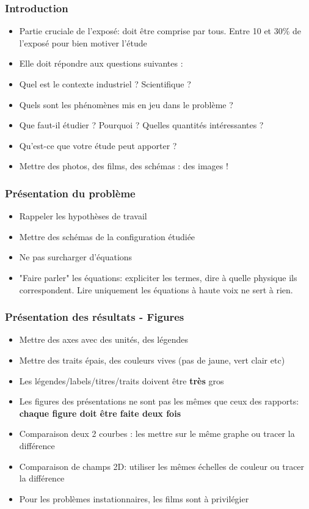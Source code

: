 \begin{appendix}
\subsubsection{Introduction}
\begin{itemize}
\item Partie cruciale de l’exposé: doit être comprise par tous. Entre 10 et 30\% de l’exposé pour bien motiver l’étude
\item Elle doit répondre aux questions suivantes :
\item Quel est le contexte industriel ? Scientifique ?
\item Quels sont les phénomènes mis en jeu dans le problème ?
\item Que faut-il étudier ? Pourquoi ? Quelles quantités intéressantes ?
\item Qu’est-ce que votre étude peut apporter ?
\item Mettre des photos, des films, des schémas : des images !
\end{itemize}

\subsubsection{Présentation du problème}
\begin{itemize}
\item Rappeler les hypothèses de travail
\item Mettre des schémas de la configuration étudiée
\item Ne pas surcharger d’équations
\item "Faire parler" les équations: expliciter les termes, dire à quelle physique ils correspondent. Lire uniquement les équations à haute voix ne sert à rien.
\end{itemize}

\subsubsection{Présentation des résultats - Figures}
\begin{itemize}
\item Mettre des axes avec des unités, des légendes
\item Mettre des traits épais, des couleurs vives (pas de jaune, vert clair etc)
\item Les légendes/labels/titres/traits doivent être \textbf{très} gros
\item Les figures des présentations ne sont pas les mêmes que ceux des rapports: \textbf{chaque figure doit être faite deux fois}
\item Comparaison deux 2 courbes : les mettre sur le même graphe ou tracer la différence
\item Comparaison de champs 2D: utiliser les mêmes échelles de couleur ou tracer la différence
\item Pour les problèmes instationnaires, les films sont à privilégier
\end{itemize}

\end{appendix}
